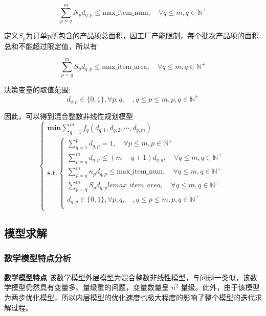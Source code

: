\documentclass[bwprint]{gmcmthesis}
\begin{document}
\begin{equation}   
    \sum_{p=q}^{m} N_pd_{q,p} \le \text{max\_item\_num},\quad \forall q \le m, q\in \mathbb{N}^+
\end{equation}

定义$S_p$为订单p所包含的产品项总面积，因工厂产能限制，每个批次产品项的面积总和不能超过限定值，所以有

\begin{equation}   
    \sum_{p=q}^{m} S_pd_{q,p} \le \text{max\_item\_area},\quad \forall q\le m,q\in \mathbb{N}^+
\end{equation}

决策变量的取值范围:
\begin{equation}
    d_{q,p} \in \{0,1\},  \forall p,q,\quad,q\le p \le m,  p,q\in \mathbb{N}^+
\end{equation}

因此，可以得到混合整数非线性规划模型
\begin{equation}
    \begin{cases}
        \mathbf{min} \sum_{q=1}^{m} f_q(d_{q,1},d_{q,2},\cdots,d_{q,m}) \\
        \mathbf{s.t.}
        \begin{cases}
            \sum_{q=1}^{p} d_{q,p}=1,\quad \forall p\le m,p \in \mathbb{N}^+ \\
            \sum_{p=q}^{m} d_{q,p} \le (m-q+1)d_{q,q},\quad \forall q\le m,q\in \mathbb{N}^+  \\
            \sum_{p=q}^{m} n_pd_{q,p} \le \text{max\_item\_num},\quad \forall q \le m, q\in \mathbb{N}^+\\
            \sum_{p=q}^{m} S_pd_{q,p} le max\_item\_area,\quad \forall q\le m,q\in \mathbb{N}^+ \\
            d_{q,p} \in \{0,1\}, \forall p,q,\quad,q\le p \le m,  p,q\in \mathbb{N}^+\\
        \end{cases}  \label{问题二模型}
    \end{cases}
\end{equation}


\subsection{模型求解}
\subsubsection{数学模型特点分析}
	\textbf{数学模型特点} \quad 该数学模型外层模型为混合整数非线性模型，与问题一类似，该数学模型仍然具有变量多、量级重的问题，变量数量呈 $ n^2 $ 量级。此外，由于该模型为两步优化模型，所以内层模型的优化速度也极大程度的影响了整个模型的迭代求解过程。
	
\end{document}
